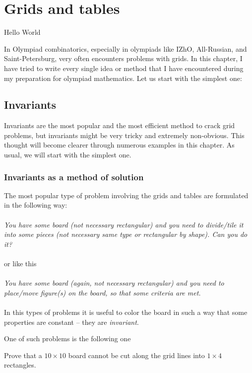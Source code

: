 \chapter{Grids and tables} Hello World

In Olympiad combinatorics, especially in olympiads like IZhO, All-Russian, and Saint-Petersburg, very often encounters problems with grids. In this chapter, I have tried to write every single idea or method that I have encountered during my preparation for olympiad mathematics. Let us start with the simplest one:

\section{Invariants}

Invariants are the most popular and the most efficient method to crack grid problems, but invariants might be very tricky and extremely non-obvious. This thought will become clearer through numerous examples in this chapter. As usual, we will start with the simplest one.

\subsection{Invariants as a method of solution}

The most popular type of problem involving the grids and tables are formulated in the following way:
\\\\
\textit{You have some board (not necessary rectangular) and you need to divide/tile it into some pieces (not necessary same type or rectangular by shape). Can you do it?}
\\\\
or like this
\\\\
\textit{You have some board (again, not necessary rectangular) and you need to place/move figure(s) on the board, so that some criteria are met.}
\\\\
In this types of problems it is useful to color the board in such a way that some properties are constant -- they are \textit{invariant}.

One of such problems is the following one

\begin{example}
    Prove that a $10\times 10$ board cannot be cut along the grid lines into $1\times 4$ rectangles.
\end{example}

